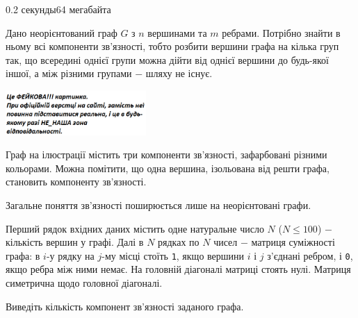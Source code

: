 \begin{problem}{}{}{}{0.2 секунды}{64 мегабайта}

Дано неорієнтований граф $G$ з $n$ вершинами та $m$ ребрами. Потрібно знайти в ньому всі компоненти зв'язності, 
тобто розбити вершини графа на кілька груп так, що всередині однієї групи можна дійти від однієї вершини до будь-якої іншої,
а між різними групами $-$ шляху не існує.

  \begin{center}
    \includegraphics[width=0.40\textwidth,natwidth=232,natheight=217]{pic.png}
  \end{center}

Граф на ілюстрації містить три компоненти зв'язності, зафарбовані різними кольорами.
Можна помітити, що одна вершина, ізольована від решти графа, становить компоненту зв'язності.


Загальне поняття зв'язності поширюється лише на неорієнтовані графи.

\InputFile
Перший рядок вхідних даних містить одне натуральне число $N$ ($N \leqslant 100$) $-$ кількість вершин у графі.
Далі в $N$ рядках по $N$ чисел $-$ матриця суміжності графа: в $i$-у рядку на $j$-му місці стоїть \texttt{1}, якщо вершини $i$ і $j$ 
з'єднані ребром, і \texttt{0}, якщо ребра між ними немає. 
На головній діагоналі матриці стоять нулі. Матриця симетрична щодо головної діагоналі.

\OutputFile
Виведіть кількість компонент зв'язності заданого графа.


\Example
\begin{example}
%
\end{example}

\end{problem}
